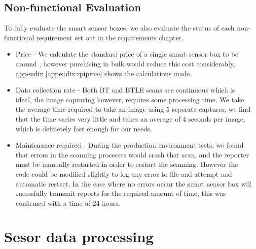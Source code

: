 \documentclass{l4proj}
\begin{document}
\subsection{Non-functional Evaluation}
To fully evaluate the smart sensor boxes, we also evaluate the status of each non-functional requirement set out in the requirements chapter.

\begin{itemize}	
  \item Price - We calculate the standard price of a single smart sensor box to be around , however purchising in bulk would reduce this cost considerably, appendix \ref{appendix:rpiprice} shows the calculations made.
  \item Data collection rate - Both BT and BTLE scans are continuous which is ideal, the image capturing however, requires some processing time. We take the average time required to take an image using 5 seperate captures, we find that the time varies very little and takes an average of 4 seconds per image, which is definetely fast enough for our needs. 
  \item Maintenance required - During the production environment tests, we found that errors in the scanning processes would crash that scan, and the reporter must be manually restarted in order to restart the scanning. However the code could be modified slightly to log any error to file and attempt and automatic restart. In the case where no errors occur the smart sensor box will sucessfully transmit reports for the required amount of time, this was confirmed with a time of 24 hours. 
\end{itemize}


\section{Sesor data processing}
\end{document}
